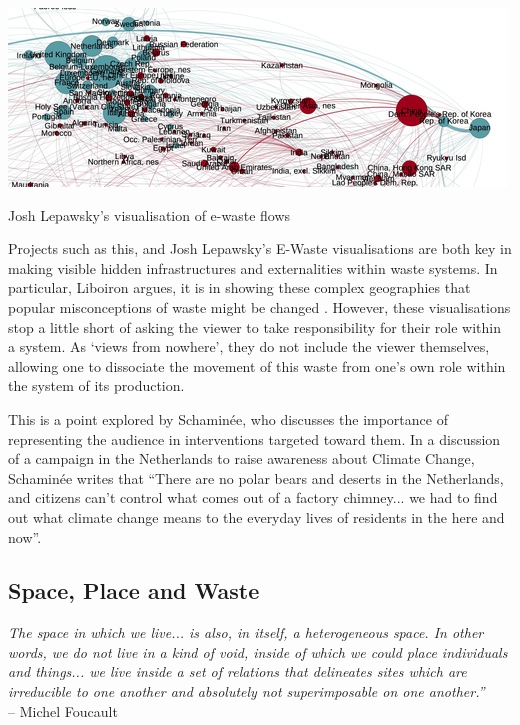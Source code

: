 \documentclass[nofonts,nols,justified,nobib]{tufte-book}
\begin{document}
\begin{marginfigure}
\includegraphics[width=\textwidth]{img/1/lepwasky-ewaste-flows-2012.jpg}
\caption{Josh Lepawsky's visualisation of e-waste flows}
\end{marginfigure}

Projects such as this, and Josh Lepawsky's E-Waste visualisations \cite{lepawsky_changing_2015} are both key in making visible hidden infrastructures and externalities within waste systems. In particular, Liboiron argues, it is in showing these complex geographies that popular misconceptions of waste might be changed \cite{liboiron_mapping_2014}. However, these visualisations stop a little short of asking the viewer to take responsibility for their role within a system. As `views from nowhere', they do not include the viewer themselves, allowing one to dissociate the movement of this waste from one's own role within the system of its production.

This is a point explored by Schamin\'ee, who discusses the importance of representing the audience in interventions targeted toward them. In a discussion of a campaign in the Netherlands to raise awareness about Climate Change, Schamin\'ee writes that ``There are no polar bears and deserts in the Netherlands, and citizens can't control what comes out of a factory chimney... we had to find out what climate change means to the everyday lives of residents in the here and now''. \cite{schaminee_designing_2018}

\subsection*{Space, Place and Waste}
\begin{flushright}
\emph{The space in which we live... is also, in itself, a heterogeneous space. In other words, we do not live in a kind of void, inside of which we could place individuals and things... we live inside a set of relations that delineates sites which are irreducible to one another and absolutely not superimposable on one another.''}\cite{foucault_other_1967}\\
-- Michel Foucault
\end{flushright}
\end{document}
